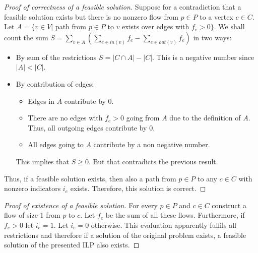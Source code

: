 \begin{proof}[Proof of correctness of a feasible solution]
  Suppose for a contradiction that a feasible solution exists but there is no nonzero flow from $p \in P$ to a vertex $c \in C$. Let $A = \{v \in V | $ path from $p \in P$ to $v$ exists over edges with $ f_e \gt 0\}$. We shall count the sum $S = \sum_{v \in A}(\sum_{e \in in(v)} f_e - \sum_{e \in out(v)} f_e)$ in two ways:
  \begin{itemize}
    \item By sum of the restrictions $S = | C \cap A | - | C |$. This is a negative number since $| A | \lt | C |$.
    \item By contribution of edges:
      \begin{itemize}
        \item Edges in $A$ contribute by $0$.
        \item There are no edges with $f_e \gt 0$ going from $A$ due to the definition of $A$. Thus, all outgoing edges contribute by $0$.
        \item All edges going to $A$ contribute by a non negative number.
      \end{itemize}
      This implies that $S \geq 0$. But that contradicts the previous result.
    \end{itemize}
  Thus, if a feasible solution exists, then also a path from $p \in P$ to any $c \in C$ with nonzero indicators $i_e$ exists. Therefore, this solution is correct.
\end{proof}
\begin{proof}[Proof of existence of a feasible solution]
  For every $p \in P$ and $c \in C$ construct a flow of size 1 from $p$ to $c$. Let $f_e$ be the sum of all these flows. Furthermore, if $f_e \gt 0$ let $i_e = 1$. Let $i_e = 0$ otherwise. This evaluation apparently fulfils all restrictions and therefore if a solution of the original problem exists, a feasible solution of the presented ILP also exists.
\end{proof}
\myendalg
